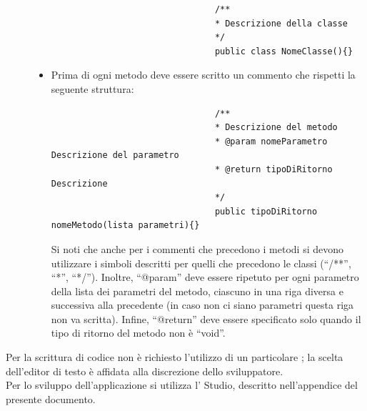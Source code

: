 \begin{description}
\begin{itemize}
							\begin{lstlisting}
								/**
								* Descrizione della classe
								*/
								public class NomeClasse(){}
							\end{lstlisting}
							\item Prima di ogni metodo deve essere scritto un commento che rispetti la seguente struttura:
							\begin{lstlisting}
								/**
								* Descrizione del metodo
								* @param nomeParametro Descrizione del parametro 
								* @return tipoDiRitorno Descrizione 
								*/
								public tipoDiRitorno nomeMetodo(lista parametri){}
							\end{lstlisting}
							Si noti che anche per i commenti che precedono i metodi si devono utilizzare i simboli descritti per quelli che precedono le classi (“/**”, “*”, “*/”). Inoltre, “@param” deve essere ripetuto per ogni parametro della lista dei parametri del metodo, ciascuno in una riga diversa e successiva alla precedente (in caso non ci siano parametri questa riga non va scritta). Infine, “@return” deve essere specificato solo quando il tipo di ritorno del metodo non è “void”.
						\end{itemize}
			\end{description}
			Per la scrittura di codice  non è richiesto l'utilizzo di un particolare ; la scelta dell'editor di testo è affidata alla discrezione dello sviluppatore.\\
			Per lo sviluppo dell'applicazione  si utilizza l'  Studio, descritto nell'appendice  del presente documento.